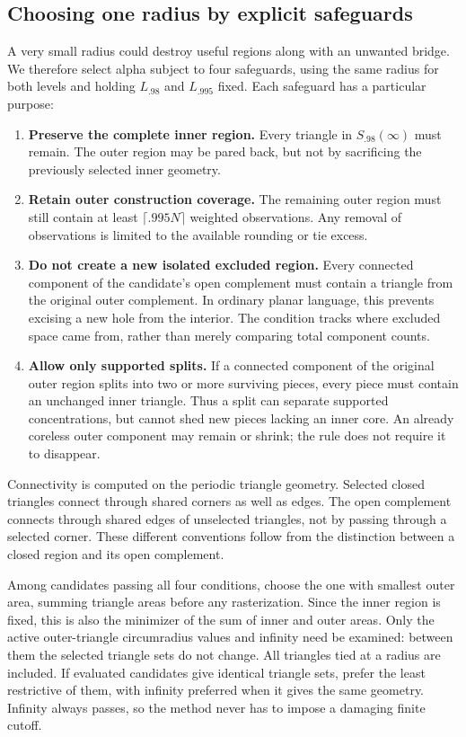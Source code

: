 \documentclass[11pt]{article}
\begin{document}
\subsection{Choosing one radius by explicit safeguards}

A very small radius could destroy useful regions along with an unwanted
bridge. We therefore select alpha subject to four safeguards, using the
same radius for both levels and holding $L_{.98}$ and $L_{.995}$ fixed.
Each safeguard has a particular purpose:
\begin{enumerate}
\item \textbf{Preserve the complete inner region.} Every triangle in
$S_{.98}(\infty)$ must remain. The outer region may be pared back, but not
by sacrificing the previously selected inner geometry.
\item \textbf{Retain outer construction coverage.} The remaining outer
region must still contain at least $\lceil .995N\rceil$ weighted
observations. Any removal of observations is limited to the available
rounding or tie excess.
\item \textbf{Do not create a new isolated excluded region.} Every connected
component of the candidate's open complement must contain a triangle from
the original outer complement. In ordinary planar language, this prevents
excising a new hole from the interior. The condition tracks where excluded
space came from, rather than merely comparing total component counts.
\item \textbf{Allow only supported splits.} If a connected component of
the original outer region splits into two or more surviving pieces, every
piece must contain an unchanged inner triangle. Thus a split can separate
supported concentrations, but cannot shed new pieces lacking an inner core.
An already coreless outer component may remain or shrink; the rule does
not require it to disappear.
\end{enumerate}

Connectivity is computed on the periodic triangle geometry. Selected closed
triangles connect through shared corners as well as edges. The open
complement connects through shared edges of unselected triangles, not by
passing through a selected corner. These different conventions follow from
the distinction between a closed region and its open complement.

Among candidates passing all four conditions, choose the one with smallest
outer area, summing triangle areas before any rasterization. Since the inner
region is fixed, this is also the minimizer of the sum of inner and outer
areas. Only the active outer-triangle circumradius values and infinity need
be examined: between them the selected triangle sets do not change. All
triangles tied at a radius are included. If evaluated candidates give
identical triangle sets, prefer the least restrictive of them, with infinity
preferred when it gives the same geometry. Infinity always passes, so the
method never has to impose a damaging finite cutoff.
\end{document}
